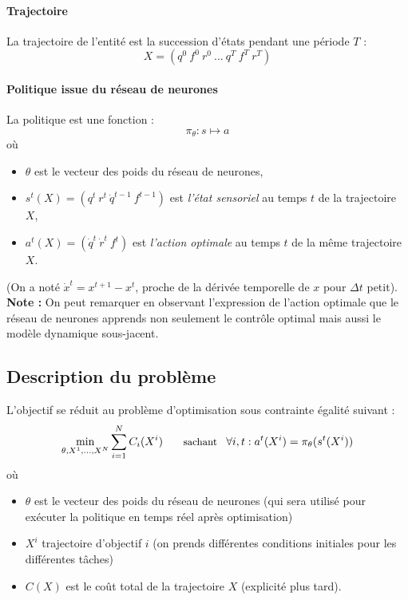 \documentclass[a4paper,10pt]{article}
\begin{document}
\paragraph{Trajectoire} La trajectoire de l'entité est la succession d'états pendant une période $T$ : 
\[ X = (q^0~f^0~r^0~...~q^T~f^T~r^T) \]
\paragraph{Politique issue du réseau de neurones\\}
La politique est une fonction :
\[ \pi_{\theta} : s \mapsto a \] où 
\begin{itemize}
\item $\theta$ est le vecteur des poids du réseau de neurones,
\item $s^t(X) = (q^t~r^t~\dot{q}^{t-1}~f^{t-1})$  est \textit{l'état sensoriel} au temps $t$ de la trajectoire $X$,
\item $a^t(X) = (\dot{q}^{t}~\dot{r}^{t}~f^{t})$ est \textit{l'action optimale} au temps $t$ de la même trajectoire $X$.
\end{itemize}
(On a noté $\dot{x}^t = x^{t+1}-x^t$, proche de la dérivée temporelle de $x$ pour $\Delta t$ petit).\\
\textbf{Note :} On peut remarquer en observant l'expression de l'action optimale que le réseau de neurones apprends non seulement le contrôle optimal mais aussi le modèle dynamique sous-jacent. 
\subsection{Description du problème}
L'objectif se réduit au problème d'optimisation sous contrainte égalité suivant : 
  \begin{align}
  \min_{\theta,X^1,...,X^N} \sum\limits_{i=1}^{N} C_{i}(X^{i}) \hspace{15pt}\text{ \small sachant } \hspace{5pt} \forall i,t : a^{t}(X^{i}) = \pi_{\theta}(s^{t}(X^{i}))
  \end{align}
où
  \begin{itemize}
  \item $\theta$ est le vecteur des poids du réseau de neurones (qui sera utilisé pour exécuter la politique en temps réel après optimisation)
  \item $X^{i}$ trajectoire d'objectif $i$ (on prends différentes conditions initiales pour les différentes tâches)
  \item $C(X)$ est le coût total de la trajectoire $X$ (explicité plus tard).
  \end{itemize}
  
\end{document}
